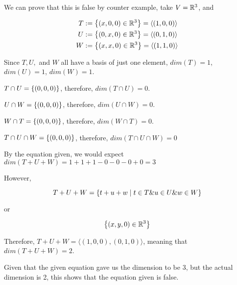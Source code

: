 \documentclass[12pt]{article} %
\begin{document}
\begin{homeworkProblem}


    We can prove that this is false by counter example, take $V = \mathbb{R}^3$, and

    \begin{align*}
        T & := \left\{(x, 0, 0) \in \mathbb{R}^3\right\} = \langle(1, 0, 0)\rangle \\
        U & := \left\{(0, x, 0) \in \mathbb{R}^3\right\} = \langle(0, 1, 0)\rangle \\
        W & := \left\{(x, x, 0) \in \mathbb{R}^3\right\} = \langle(1, 1, 0)\rangle \\
    \end{align*}

    Since $T, U, $ and $W$ all have a basis of just one element, $dim(T) = 1$, $dim(U) = 1$, $dim(W) = 1$.


    $T \cap U = \left\{(0, 0, 0)\right\}$, therefore, $dim(T \cap U) = 0$.

    $U \cap W = \left\{(0, 0, 0)\right\}$, therefore, $dim(U \cap W) = 0$.

    $W \cap T = \left\{(0, 0, 0)\right\}$, therefore, $dim(W \cap T) = 0$.

    $T \cap U \cap W = \left\{(0, 0, 0)\right\}$, therefore, $dim(T \cap U \cap W) = 0$

    By the equation given, we would expect $dim(T + U + W) = 1 + 1 + 1 - 0 - 0 - 0 + 0 = 3$


    However,

    $$T + U + W = \left\{t + u + w \mid t \in T \& u \in U \& w \in W\right\}$$

    or

    $$\left\{(x, y, 0) \in \mathbb{R}^3\right\}$$


    Therefore, $T + U + W = \langle (1, 0, 0), (0, 1, 0) \rangle$, meaning that $dim(T + U + W) = 2$.

    Given that the given equation gave us the dimension to be 3, but the actual dimension is 2, this shows that the equation given is false.

\end{homeworkProblem}
\end{document}
